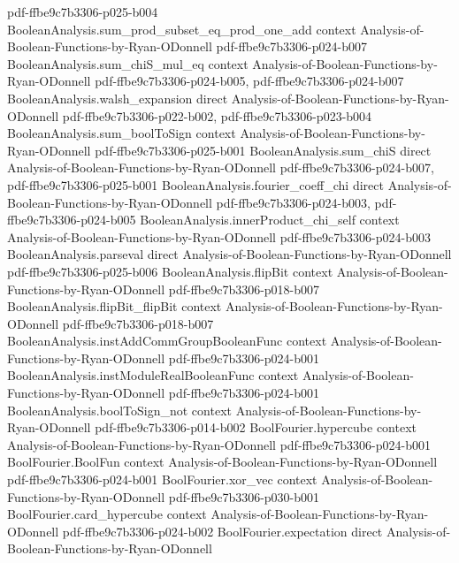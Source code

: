 \begin{lemma}
  {pdf-ffbe9c7b3306-p025-b004}
\proofstep
  {BooleanAnalysis.sum_prod_subset_eq_prod_one_add}
  {context}
  {Analysis-of-Boolean-Functions-by-Ryan-ODonnell}
  {pdf-ffbe9c7b3306-p024-b007}
\proofstep
  {BooleanAnalysis.sum_chiS_mul_eq}
  {context}
  {Analysis-of-Boolean-Functions-by-Ryan-ODonnell}
  {pdf-ffbe9c7b3306-p024-b005,
    pdf-ffbe9c7b3306-p024-b007}
\proofstep
  {BooleanAnalysis.walsh_expansion}
  {direct}
  {Analysis-of-Boolean-Functions-by-Ryan-ODonnell}
  {pdf-ffbe9c7b3306-p022-b002,
    pdf-ffbe9c7b3306-p023-b004}
\proofstep
  {BooleanAnalysis.sum_boolToSign}
  {context}
  {Analysis-of-Boolean-Functions-by-Ryan-ODonnell}
  {pdf-ffbe9c7b3306-p025-b001}
\proofstep
  {BooleanAnalysis.sum_chiS}
  {direct}
  {Analysis-of-Boolean-Functions-by-Ryan-ODonnell}
  {pdf-ffbe9c7b3306-p024-b007,
    pdf-ffbe9c7b3306-p025-b001}
\proofstep
  {BooleanAnalysis.fourier_coeff_chi}
  {direct}
  {Analysis-of-Boolean-Functions-by-Ryan-ODonnell}
  {pdf-ffbe9c7b3306-p024-b003,
    pdf-ffbe9c7b3306-p024-b005}
\proofstep
  {BooleanAnalysis.innerProduct_chi_self}
  {context}
  {Analysis-of-Boolean-Functions-by-Ryan-ODonnell}
  {pdf-ffbe9c7b3306-p024-b003}
\proofstep
  {BooleanAnalysis.parseval}
  {direct}
  {Analysis-of-Boolean-Functions-by-Ryan-ODonnell}
  {pdf-ffbe9c7b3306-p025-b006}
\proofstep
  {BooleanAnalysis.flipBit}
  {context}
  {Analysis-of-Boolean-Functions-by-Ryan-ODonnell}
  {pdf-ffbe9c7b3306-p018-b007}
\proofstep
  {BooleanAnalysis.flipBit_flipBit}
  {context}
  {Analysis-of-Boolean-Functions-by-Ryan-ODonnell}
  {pdf-ffbe9c7b3306-p018-b007}
\proofstep
  {BooleanAnalysis.instAddCommGroupBooleanFunc}
  {context}
  {Analysis-of-Boolean-Functions-by-Ryan-ODonnell}
  {pdf-ffbe9c7b3306-p024-b001}
\proofstep
  {BooleanAnalysis.instModuleRealBooleanFunc}
  {context}
  {Analysis-of-Boolean-Functions-by-Ryan-ODonnell}
  {pdf-ffbe9c7b3306-p024-b001}
\proofstep
  {BooleanAnalysis.boolToSign_not}
  {context}
  {Analysis-of-Boolean-Functions-by-Ryan-ODonnell}
  {pdf-ffbe9c7b3306-p014-b002}
\proofstep
  {BoolFourier.hypercube}
  {context}
  {Analysis-of-Boolean-Functions-by-Ryan-ODonnell}
  {pdf-ffbe9c7b3306-p024-b001}
\proofstep
  {BoolFourier.BoolFun}
  {context}
  {Analysis-of-Boolean-Functions-by-Ryan-ODonnell}
  {pdf-ffbe9c7b3306-p024-b001}
\proofstep
  {BoolFourier.xor_vec}
  {context}
  {Analysis-of-Boolean-Functions-by-Ryan-ODonnell}
  {pdf-ffbe9c7b3306-p030-b001}
\proofstep
  {BoolFourier.card_hypercube}
  {context}
  {Analysis-of-Boolean-Functions-by-Ryan-ODonnell}
  {pdf-ffbe9c7b3306-p024-b002}
\proofstep
  {BoolFourier.expectation}
  {direct}
  {Analysis-of-Boolean-Functions-by-Ryan-ODonnell}

\end{lemma}
